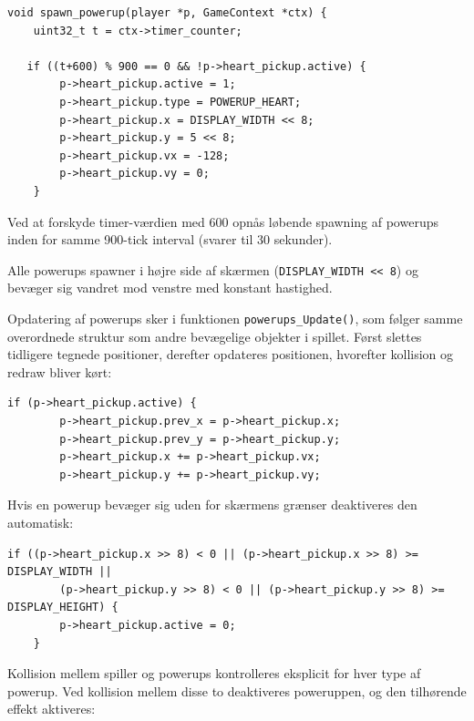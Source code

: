 \begin{lstlisting} 
void spawn_powerup(player *p, GameContext *ctx) {
    uint32_t t = ctx->timer_counter;

   if ((t+600) % 900 == 0 && !p->heart_pickup.active) {
        p->heart_pickup.active = 1;
        p->heart_pickup.type = POWERUP_HEART;
        p->heart_pickup.x = DISPLAY_WIDTH << 8;
        p->heart_pickup.y = 5 << 8;
        p->heart_pickup.vx = -128;
        p->heart_pickup.vy = 0;
    }
\end{lstlisting}
\vspace{-2em}

Ved at forskyde timer-værdien med 600 opnås løbende spawning af powerups inden for samme 900-tick interval (svarer til 30 sekunder).

Alle powerups spawner i højre side af skærmen (\texttt{DISPLAY\_WIDTH << 8}) og bevæger sig vandret mod venstre med konstant hastighed.

Opdatering af powerups sker i funktionen \texttt{powerups\_Update()}, som følger samme overordnede struktur som andre bevægelige objekter i spillet. Først slettes tidligere tegnede positioner, derefter opdateres positionen, hvorefter kollision og redraw bliver kørt:\\

\begin{lstlisting} 
if (p->heart_pickup.active) {
        p->heart_pickup.prev_x = p->heart_pickup.x;
        p->heart_pickup.prev_y = p->heart_pickup.y;
        p->heart_pickup.x += p->heart_pickup.vx;
        p->heart_pickup.y += p->heart_pickup.vy;
\end{lstlisting}
\vspace{-2em}

Hvis en powerup bevæger sig uden for skærmens grænser deaktiveres den automatisk:\\

\begin{lstlisting} 
if ((p->heart_pickup.x >> 8) < 0 || (p->heart_pickup.x >> 8) >= DISPLAY_WIDTH ||
        (p->heart_pickup.y >> 8) < 0 || (p->heart_pickup.y >> 8) >= DISPLAY_HEIGHT) {
        p->heart_pickup.active = 0;
    }
\end{lstlisting}
\vspace{-2em}

Kollision mellem spiller og powerups kontrolleres eksplicit for hver type af powerup. Ved kollision mellem disse to deaktiveres poweruppen, og den tilhørende effekt aktiveres:\\

